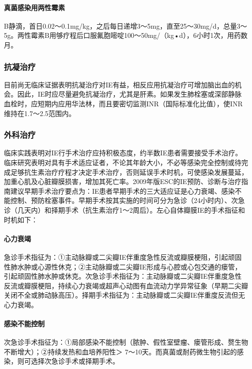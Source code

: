 \paragraph{真菌感染用两性霉素}

B静滴，首日0.02～0.1mg/kg，之后每日递增3～5mg，直至25～30mg/d，总量3～5g。两性霉素B用够疗程后口服氟胞嘧啶100～50mg/（kg•d），6小时1次，用药数月。

\subsubsection{抗凝治疗}

目前尚无临床证据表明抗凝治疗对IE有益，相反应用抗凝治疗可增加脑出血的机会。因此，IE时应尽量避免抗凝治疗，尤其是肝素。如果发生肺栓塞或深部静脉血栓时，应短期内应用华法林，而且要密切监测INR（国际标准化比值），使INR维持在1.7～2.5范围内。

\subsubsection{外科治疗}

临床实践表明对IE行手术治疗应持积极态度，约半数IE患者需要接受手术治疗。临床研究表明对具有手术适应证者，不论其年龄大小，不必等感染完全控制或待完成足够抗生素治疗疗程才决定手术治疗，否则延误手术时机，可使感染发展蔓延，加重心肌及心脏瓣膜损害，增加其死亡率。2009年版ESC的IE预防、诊断与治疗指南建议早期手术治疗要点为：IE患者早期手术的三大适应证是心力衰竭、感染不能控制、预防栓塞事件。早期手术按其实施的时间可分为急诊（24小时内）、次急诊（几天内）和择期手术（抗生素治疗1～2周后）。左心自体瓣膜IE的手术指征和时机如下：

\paragraph{心力衰竭}

急诊手术指征为：①主动脉瓣或二尖瓣IE伴重度急性反流或瓣膜梗阻，引起顽固性肺水肿或心源性休克；②主动脉瓣或二尖瓣IE形成与心腔或心包交通的瘘管，引起顽固性肺水肿或休克。次急诊手术指征为：主动脉瓣或二尖瓣IE伴重度急性反流或瓣膜梗阻，持续心力衰竭或超声心动图有血流动力学异常征象（早期二尖瓣关闭不全或肺动脉高压）。择期手术指征为：主动脉瓣或二尖瓣IE伴重度反流但无心力衰竭。

\paragraph{感染不能控制}

次急诊手术指征为：①局部感染不能控制（脓肿、假性室壁瘤、瘘管形成、赘生物不断增大）；②持续发热和血培养阳性＞
7～10天。而真菌或耐药微生物引起的感染，则可选择次急诊手术或择期手术。

